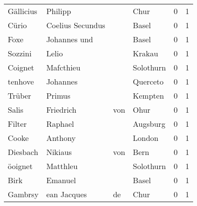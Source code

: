 \documentclass[10pt,a4paper,landscape]{article}
\begin{document}
\begin{longtable}{llllrr}
                Gällicius &                            Philipp &             &                                        Chur &          0 &         1 \\
                    Cürio &                   Coelius Secundus &             &                                       Basel &          0 &         1 \\
                     Foxe &                       Johannes und &             &                                       Basel &          0 &         1 \\
                  Sozzini &                              Lelio &             &                                      Krakau &          0 &         1 \\
                  Coignet &                          Mafcthieu &             &                                   Solothurn &          0 &         1 \\
                  tenhove &                           Johannes &             &                                    Querceto &          0 &         1 \\
                   Trüber &                             Primus &             &                                     Kempten &          0 &         1 \\
                    Salis &                          Friedrich &         von &                                        Ohur &          0 &         1 \\
                   Filter &                            Raphael &             &                                    Augsburg &          0 &         1 \\
                    Cooke &                            Anthony &             &                                      London &          0 &         1 \\
                 Diesbach &                            Nikiaus &         von &                                        Bern &          0 &         1 \\
                  öoignet &                           Matthleu &             &                                   Solothurn &          0 &         1 \\
                     Birk &                            Emanuel &             &                                       Basel &          0 &         1 \\
                  Gambrsy &                        ean Jacques &          de &                                        Chur &          0 &         1 \\

\end{longtable}
\end{document}
